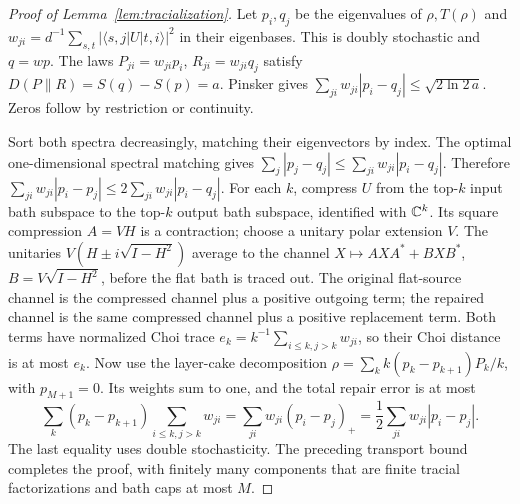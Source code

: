 \begin{proof}[Proof of Lemma~\ref{lem:tracialization}]
Let $p_i,q_j$ be the eigenvalues of $\rho,T(\rho)$ and
$w_{ji}=d^{-1}\sum_{s,t}|\langle s,j|U|t,i\rangle|^2$ in their eigenbases.
This is doubly stochastic and $q=wp$. The laws $P_{ji}=w_{ji}p_i$, $R_{ji}=w_{ji}q_j$ satisfy
$D(P\|R)=S(q)-S(p)=a$. Pinsker gives
$\sum_{ji}w_{ji}|p_i-q_j|\le\sqrt{2\ln2\,a}$.
Zeros follow by restriction or continuity.

Sort both spectra decreasingly, matching their eigenvectors by index. The optimal one-dimensional spectral matching gives
$\sum_j|p_j-q_j|\le\sum_{ji}w_{ji}|p_i-q_j|$. Therefore
$\sum_{ji}w_{ji}|p_i-p_j|\le2\sum_{ji}w_{ji}|p_i-q_j|$.
For each $k$, compress $U$ from the top-$k$ input bath subspace to the top-$k$ output bath subspace, identified with $\mathbb C^k$.
Its square compression $A=VH$ is a contraction; choose a unitary polar extension $V$.
The unitaries $V(H\pm i\sqrt{I-H^2})$ average to the channel
$X\mapsto AXA^*+BXB^*$, $B=V\sqrt{I-H^2}$, before the flat bath is traced out.
The original flat-source channel is the compressed channel plus a positive outgoing term; the repaired channel is the same compressed
channel plus a positive replacement term. Both terms have normalized Choi trace
$e_k=k^{-1}\sum_{i\le k,j>k}w_{ji}$, so their Choi distance is at most $e_k$.
Now use the layer-cake decomposition
$\rho=\sum_k k(p_k-p_{k+1})P_k/k$, with $p_{M+1}=0$. Its weights sum to one, and the total repair error is at most
\[
 \sum_k(p_k-p_{k+1})\sum_{i\le k,j>k}w_{ji}
 =\sum_{ji}w_{ji}(p_i-p_j)_+
 =\frac12\sum_{ji}w_{ji}|p_i-p_j|.
\]
The last equality uses double stochasticity. The preceding transport bound completes the proof, with finitely many components that are finite tracial factorizations
and bath caps at most $M$.
\end{proof}

